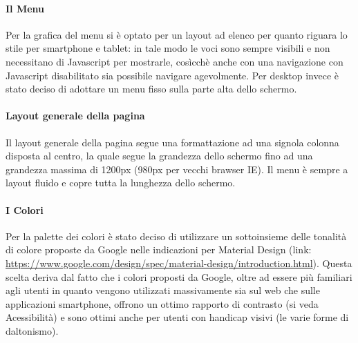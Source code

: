 \paragraph*{Il Menu}
Per la grafica del menu si è optato per un layout ad elenco per quanto riguara lo stile per smartphone e tablet: in tale modo le voci sono sempre visibili e non necessitano di Javascript per mostrarle, cosìcch\`e anche con una navigazione con Javascript disabilitato sia possibile navigare agevolmente.
Per desktop invece è stato deciso di adottare un menu fisso sulla parte alta dello schermo.

\paragraph*{Layout generale della pagina}
Il layout generale della pagina segue una formattazione ad una signola colonna disposta al centro, la quale segue la grandezza dello schermo fino ad una grandezza massima di 1200px (980px per vecchi brawser IE).
Il menu è sempre a layout fluido e copre tutta la lunghezza dello schermo.

\paragraph*{I Colori}
Per la palette dei colori è stato deciso di utilizzare un sottoinsieme delle tonalità di colore proposte da Google nelle indicazioni per Material Design (link:  \url{https://www.google.com/design/spec/material-design/introduction.html}). Questa scelta deriva dal fatto che i colori proposti da Google, oltre ad essere più familiari agli utenti in quanto vengono utilizzati massivamente sia sul web che sulle applicazioni smartphone, offrono un ottimo rapporto di contrasto (si veda Acessibilità) e sono ottimi anche per utenti con handicap visivi (le varie forme di daltonismo).
